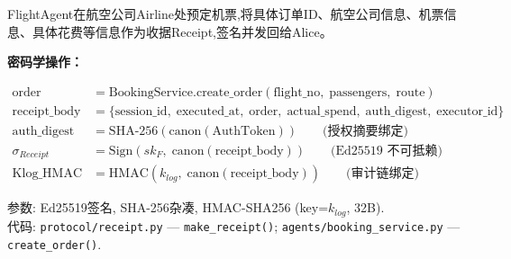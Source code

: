 \item [step6] FlightAgent在航空公司Airline处预定机票,将具体订单ID、航空公司信息、机票信息、具体花费等信息作为收据Receipt,签名并发回给Alice。

    \textbf{密码学操作：}
    \begin{coreconcept}
    \begin{align*}
        \text{order} &= \text{BookingService}.\text{create\_order}(\text{flight\_no},\; \text{passengers},\; \text{route}) \\
        \text{receipt\_body} &= \{\text{session\_id},\; \text{executed\_at},\; \text{order},\; \text{actual\_spend},\; \text{auth\_digest},\; \text{executor\_id}\} \\
        \text{auth\_digest} &= \text{SHA-256}(\text{canon}(\text{AuthToken})) \qquad \text{(授权摘要绑定)}\\
        \sigma_{Receipt} &= \text{Sign}(sk_F,\; \text{canon}(\text{receipt\_body})) \qquad \text{(Ed25519 不可抵赖)}\\
        \text{Klog\_HMAC} &= \text{HMAC}(k_{log},\; \text{canon}(\text{receipt\_body})) \qquad \text{(审计链绑定)}
    \end{align*}
    \end{coreconcept}
    参数: Ed25519签名, SHA-256杂凑, HMAC-SHA256 (key=$k_{log}$, 32B).\\
    代码: \texttt{protocol/receipt.py} — \texttt{make\_receipt()}; \texttt{agents/booking\_service.py} — \texttt{create\_order()}.

